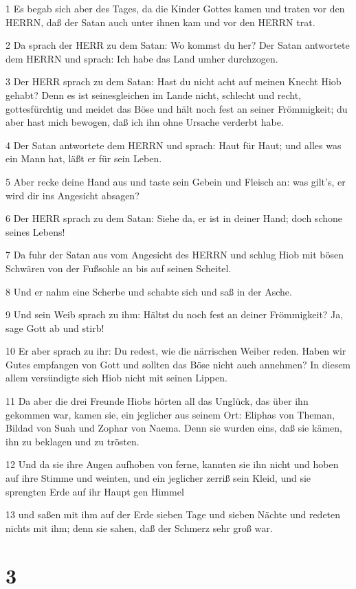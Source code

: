 \par 1 Es begab sich aber des Tages, da die Kinder Gottes kamen und traten vor den HERRN, daß der Satan auch unter ihnen kam und vor den HERRN trat.
\par 2 Da sprach der HERR zu dem Satan: Wo kommst du her? Der Satan antwortete dem HERRN und sprach: Ich habe das Land umher durchzogen.
\par 3 Der HERR sprach zu dem Satan: Hast du nicht acht auf meinen Knecht Hiob gehabt? Denn es ist seinesgleichen im Lande nicht, schlecht und recht, gottesfürchtig und meidet das Böse und hält noch fest an seiner Frömmigkeit; du aber hast mich bewogen, daß ich ihn ohne Ursache verderbt habe.
\par 4 Der Satan antwortete dem HERRN und sprach: Haut für Haut; und alles was ein Mann hat, läßt er für sein Leben.
\par 5 Aber recke deine Hand aus und taste sein Gebein und Fleisch an: was gilt's, er wird dir ins Angesicht absagen?
\par 6 Der HERR sprach zu dem Satan: Siehe da, er ist in deiner Hand; doch schone seines Lebens!
\par 7 Da fuhr der Satan aus vom Angesicht des HERRN und schlug Hiob mit bösen Schwären von der Fußsohle an bis auf seinen Scheitel.
\par 8 Und er nahm eine Scherbe und schabte sich und saß in der Asche.
\par 9 Und sein Weib sprach zu ihm: Hältst du noch fest an deiner Frömmigkeit? Ja, sage Gott ab und stirb!
\par 10 Er aber sprach zu ihr: Du redest, wie die närrischen Weiber reden. Haben wir Gutes empfangen von Gott und sollten das Böse nicht auch annehmen? In diesem allem versündigte sich Hiob nicht mit seinen Lippen.
\par 11 Da aber die drei Freunde Hiobs hörten all das Unglück, das über ihn gekommen war, kamen sie, ein jeglicher aus seinem Ort: Eliphas von Theman, Bildad von Suah und Zophar von Naema. Denn sie wurden eins, daß sie kämen, ihn zu beklagen und zu trösten.
\par 12 Und da sie ihre Augen aufhoben von ferne, kannten sie ihn nicht und hoben auf ihre Stimme und weinten, und ein jeglicher zerriß sein Kleid, und sie sprengten Erde auf ihr Haupt gen Himmel
\par 13 und saßen mit ihm auf der Erde sieben Tage und sieben Nächte und redeten nichts mit ihm; denn sie sahen, daß der Schmerz sehr groß war.

\chapter{3}

